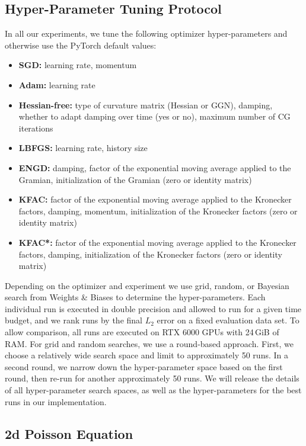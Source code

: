 \subsection{Hyper-Parameter Tuning Protocol}\label{sec:tuning-protocol}

In all our experiments, we tune the following optimizer hyper-parameters and otherwise use the PyTorch default values:
\begin{itemize}
\item \textbf{SGD:} learning rate, momentum
\item \textbf{Adam:} learning rate
\item \textbf{Hessian-free:} type of curvature matrix (Hessian or GGN), damping, whether to adapt damping over time (yes or no), maximum number of CG iterations
\item \textbf{LBFGS:} learning rate, history size
\item \textbf{ENGD:} damping, factor of the exponential moving average applied to the Gramian, initialization of the Gramian (zero or identity matrix)
\item \textbf{KFAC:} factor of the exponential moving average applied to the Kronecker factors, damping, momentum, initialization of the Kronecker factors (zero or identity matrix)
\item \textbf{KFAC*:} factor of the exponential moving average applied to the Kronecker factors, damping, initialization of the Kronecker factors (zero or identity matrix)
\end{itemize}

Depending on the optimizer and experiment we use grid, random, or Bayesian search from Weights \& Biases to determine the hyper-parameters.
Each individual run is executed in double precision and allowed to run for a given time budget, and we rank runs by the final $L_2$ error on a fixed evaluation data set. To allow comparison, all runs are executed on RTX 6000 GPUs with 24\,GiB of RAM. For grid and random searches, we use a round-based approach.
First, we choose a relatively wide search space and limit to approximately 50 runs.
In a second round, we narrow down the hyper-parameter space based on the first round, then re-run for another approximately 50 runs.
We will release the details of all hyper-parameter search spaces, as well as the hyper-parameters for the best runs in our implementation.

\subsection{2d Poisson Equation}\label{sec:2d-poisson-appendix}

